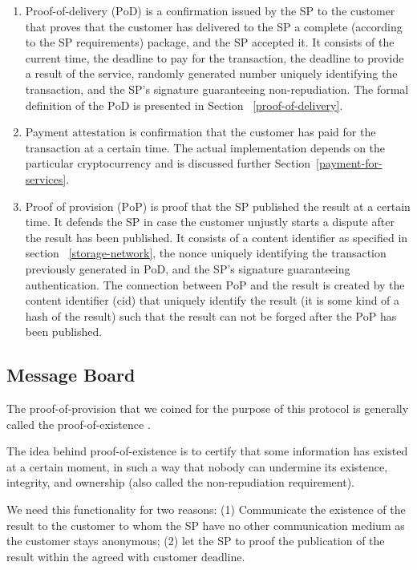 \documentclass{ieeeaccess}
\begin{document}
\begin{enumerate}
    \item Proof-of-delivery ($\mathrm{PoD}$) is a confirmation issued by the SP to the customer that proves that the customer has delivered to the SP a complete (according to the SP requirements) package, and the SP accepted it. It consists of the current time, the deadline to pay for the transaction, the deadline to provide a result of the service, randomly generated number uniquely identifying the transaction, and the SP's signature guaranteeing non-repudiation. The formal definition of the $\mathrm{PoD}$ is presented in Section ~\ref{proof-of-delivery}.
    
    \item Payment $\mathrm{attestation}$ is confirmation that the customer has paid for the transaction at a certain time. The actual implementation depends on the particular cryptocurrency and is discussed further Section~\ref{payment-for-services}.
    
    \item Proof of provision ($\mathrm{PoP}$) is proof that the SP published the result at a certain time. It defends the SP in case the customer unjustly starts a dispute after the result has been published. It consists of a content identifier as specified in section ~\ref{storage-network}, the $\mathrm{nonce}$ uniquely identifying the transaction previously generated in $\mathrm{PoD}$, and the SP's signature guaranteeing authentication. The connection between $\mathrm{PoP}$ and the result is created by the content identifier ($\mathrm{cid}$) that uniquely identify the result (it is some kind of a hash of the result) such that the result can not be forged after the $\mathrm{PoP}$ has been published.
\end{enumerate}

\subsection{Message Board}\label{message-board}
The proof-of-provision that we coined for the purpose of this protocol
is generally called the proof-of-existence
\cite{proofofexistence, de2016stampery, Chainpoi39}.

The idea behind proof-of-existence is to certify that some information
has existed at a certain moment, in such a way that nobody can
undermine its existence, integrity, and ownership (also called the
non-repudiation requirement).


We need this functionality for two reasons: (1) Communicate the existence
of the result to the customer to whom the SP have no other
communication medium as the customer stays anonymous; (2) let the SP to proof the publication of the result within the agreed with customer deadline. 
\end{document}
